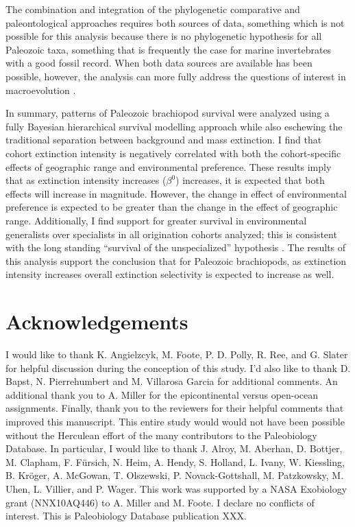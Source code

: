 \documentclass{article}
\begin{document}
The combination and integration of the phylogenetic comparative and paleontological approaches requires both sources of data, something which is not possible for this analysis because there is no phylogenetic hypothesis for all Paleozoic taxa, something that is frequently the case for marine invertebrates with a good fossil record. When both data sources are available has been possible, however, the analysis can more fully address the questions of interest in macroevolution \citep{Smits2015,Slater2013a,Slater2015b,Simpson2011,Tomiya2013,Slater2012,Raia2012c,Raia2012f,Harnik2014,Fritz2013a}.

In summary, patterns of Paleozoic brachiopod survival were analyzed using a fully Bayesian hierarchical survival modelling approach while also eschewing the traditional separation between background and mass extinction. I find that cohort extinction intensity is negatively correlated with both the cohort-specific effects of geographic range and environmental preference. These results imply that as extinction intensity increases (\(\beta^{0}\)) increases, it is expected that both effects will increase in magnitude. However, the change in effect of environmental preference is expected to be greater than the change in the effect of geographic range. Additionally, I find support for greater survival in environmental generalists over specialists in all origination cohorts analyzed; this is consistent with the long standing ``survival of the unspecialized'' hypothesis \citep{Liow2004a,Liow2007b,Simpson1944,Simpson1953,Smits2015,Nurnberg2015,Nurnberg2013a, Baumiller1993}. The results of this analysis support the conclusion that for Paleozoic brachiopods, as extinction intensity increases overall extinction selectivity is expected to increase as well.


\section*{Acknowledgements}
I would like to thank K. Angielzcyk, M. Foote, P. D. Polly, R. Ree, and G. Slater for helpful discussion during the conception of this study. I'd also like to thank D. Bapst, N. Pierrehumbert and M. Villarosa Garcia for additional comments. An additional thank you to  A. Miller for the epicontinental versus open-ocean assignments. Finally, thank you to the reviewers for their helpful comments that improved this manuscript. This entire study would would not have been possible without the Herculean effort of the many contributors to the Paleobiology Database. In particular, I would like to thank J. Alroy, M. Aberhan, D. Bottjer, M. Clapham, F. F\"{u}rsich, N. Heim, A. Hendy, S. Holland, L. Ivany, W. Kiessling, B. Kr\"{o}ger, A. McGowan, T. Olszewski, P. Novack-Gottshall, M. Patzkowsky, M. Uhen, L. Villier, and P. Wager. This work was supported by a NASA Exobiology grant (NNX10AQ446) to A. Miller and M. Foote. I declare no conflicts of interest. This is Paleobiology Database publication XXX.
\end{document}
